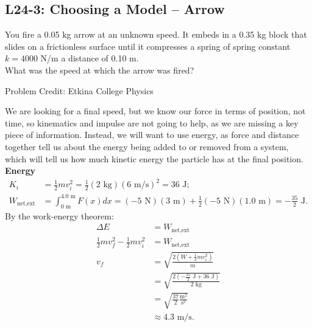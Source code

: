 \documentclass[]{article}
\newcommand{\Week}{24}
\begin{document}
\begin{PresentSpace}
\vspace{-10pt}
\section*{L\Week-3: Choosing a Model -- Arrow}
\vspace{-5pt}
You fire a 0.05 kg arrow at an unknown speed. It embeds in a 0.35 kg block that slides on a frictionless surface until it compresses a spring of spring constant $k=4000$ N/m a distance of 0.10 m. \\

\noindent What was the speed at which the arrow was fired?
\vspace{3.5cm}
\begin{center}
	\small
	Problem Credit: Etkina College Physics
\end{center}
\end{PresentSpace}
\newpage
\begin{TeacherMargin}
We are looking for a final speed, but we know our force in terms of position, not time, so kinematics and impulse are not going to help, as we are missing a key piece of information. Instead, we will want to use energy, as force and distance together tell us about the energy being added to or removed from a system, which will tell us how much kinetic energy the particle has at the final position. \\

\noindent\textbf{Energy} \\
\begin{align*}
	K_{i} & = \frac{1}{2}mv_{i}^{2} = \frac{1}{2}(2\text{ kg})(6\text{ m/s})^{2} = 36\text{ J}; \\
	W_{\text{net,ext}} & = \int_{0\text{ m}}^{4.0\text{ m}} F(x) dx = (-5\text{ N})(3\text{ m}) + \frac{1}{2}(-5\text{ N})(1.0\text{ m}) = -\frac{35}{2}\text{ J}.
\end{align*}
By the work-energy theorem:
\begin{align*}
	\Delta E & = W_{\text{net,ext}} \\
	\frac{1}{2}mv_{f}^{2} - \frac{1}{2}mv_{i}^{2} & = W_{\text{net,ext}} \\
	v_{f} & = \sqrt{\frac{2\left(W+\frac{1}{2}mv_{i}^{2}\right)}{m}} \\
	& = \sqrt{\frac{2\left(-\frac{35}{2}\text{ J}+36\text{ J}\right)}{2\text{ kg}}} \\
	& = \sqrt{\frac{37}{2}\frac{\text{m}^{2}}{\text{s}^{2}}} \\
	& \approx 4.3\text{ m/s}.
\end{align*}
\end{TeacherMargin}
\end{document}
